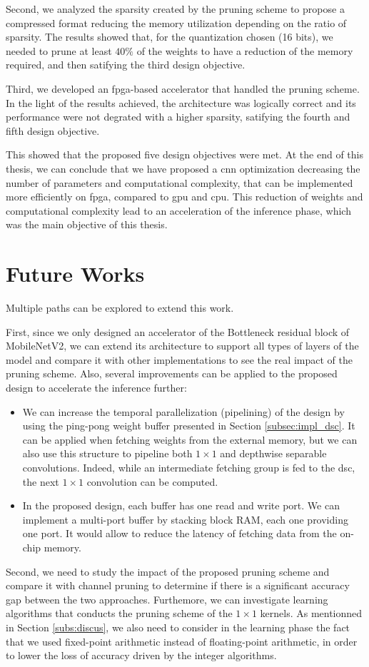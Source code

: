 Second, we analyzed the sparsity created by the pruning scheme to propose a compressed format reducing the memory utilization depending on the ratio of sparsity. The results showed that, for the quantization chosen (16 bits), we needed to prune at least $40 \%$ of the weights to have a reduction of the memory required, and then satifying the third design objective. 

Third, we developed an \acrshort{fpga}-based accelerator that handled the pruning scheme. In the light of the results achieved, the architecture was logically correct and its performance were not degrated with a higher sparsity, satifying the fourth and fifth design objective.

This showed that the proposed five design objectives were met. At the end of this thesis, we can conclude that we have proposed a \acrshort{cnn} optimization decreasing the number of parameters and computational complexity, that can be implemented more efficiently on \acrshort{fpga}, compared to \acrshort{gpu} and \acrshort{cpu}. This reduction of weights and computational complexity lead to an acceleration of the inference phase, which was the main objective of this thesis.
%
\section*{Future Works}
%
Multiple paths can be explored to extend this work.

First, since we only designed an accelerator of the Bottleneck residual block of MobileNetV2, we can extend its architecture to support all types of layers of the model and compare it with other implementations to see the real impact of the pruning scheme. Also, several improvements can be applied to the proposed design to accelerate the inference further:
%
\begin{itemize}
    \item We can increase the temporal parallelization (pipelining) of the design by using the ping-pong weight buffer presented in Section \ref{subsec:impl_dsc}. It can be applied when fetching weights from the external memory, but we can also use this structure to pipeline both $1 \times 1$ and depthwise separable convolutions. Indeed, while an intermediate fetching group is fed to the \acrshort{dsc}, the next $1 \times 1$ convolution can be computed. 
    \item In the proposed design, each buffer has one read and write port. We can implement a multi-port buffer by stacking block RAM, each one providing one port. It would allow to reduce the latency of fetching data from the on-chip memory.
\end{itemize}
%
Second, we need to study the impact of the proposed pruning scheme and compare it with channel pruning to determine if there is a significant accuracy gap between the two approaches. Furthemore, we can investigate learning algorithms that conducts the pruning scheme of the $1 \times 1$ kernels. As mentionned in Section \ref{subs:discus}, we also need to consider in the learning phase the fact that we used fixed-point arithmetic instead of floating-point arithmetic, in order to lower the loss of accuracy driven by the integer algorithms.


